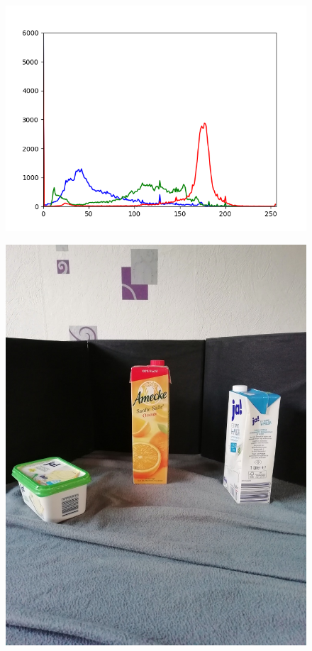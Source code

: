 \begin{appendices}
\begin{figure}[htb]
\begin{minipage}[c]{0.08\textwidth}
\end{minipage}
\hfill
\begin{minipage}[c]{0.3\textwidth}
\includegraphics[width=\textwidth]{Sources/Bild1_GW_histo.png}
\end{minipage}
\end{figure}
\begin{figure}[htb]
\begin{minipage}[c]{0.2\textwidth}
\includegraphics[width=\textwidth]{Sources/Bild2_GW.jpg}

\end{minipage}
\end{figure}
\end{appendices}
